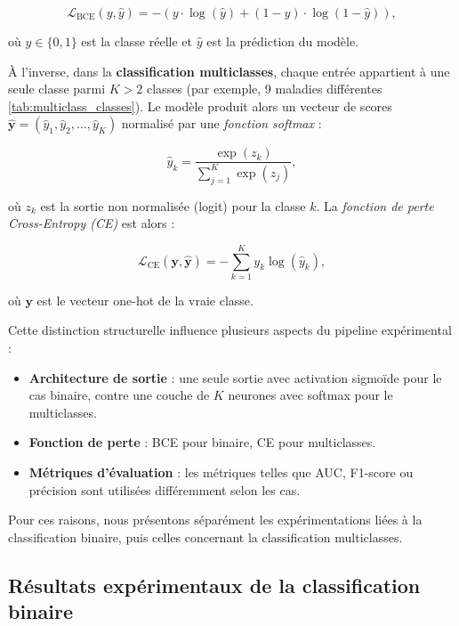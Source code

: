 \documentclass[12pt]{report}
\begin{document}
\begin{equation}
\mathcal{L}_{\text{BCE}}(y, \hat{y}) = - \left( y \cdot \log(\hat{y}) + (1 - y) \cdot \log(1 - \hat{y}) \right),
\end{equation}

où $ y \in \{0,1\} $ est la classe réelle et $ \hat{y} $ est la prédiction du modèle.

À l’inverse, dans la \textbf{classification multiclasses}, chaque entrée appartient à une seule classe parmi $K > 2$ classes (par exemple, 9 maladies différentes \autoref{tab:multiclass_classes}). Le modèle produit alors un vecteur de scores $\hat{\mathbf{y}} = (\hat{y}_1, \hat{y}_2, \ldots, \hat{y}_K)$ normalisé par une \textit{fonction softmax} :

\begin{equation}
\hat{y}_k = \frac{\exp(z_k)}{\sum_{j=1}^{K} \exp(z_j)},
\end{equation}

où $z_k$ est la sortie non normalisée (logit) pour la classe $k$. La \textit{fonction de perte Cross-Entropy (CE)} est alors :

\begin{equation}
\mathcal{L}_{\text{CE}}(\mathbf{y}, \hat{\mathbf{y}}) = - \sum_{k=1}^{K} y_k \log(\hat{y}_k),
\end{equation}

où $\mathbf{y}$ est le vecteur one-hot de la vraie classe.

Cette distinction structurelle influence plusieurs aspects du pipeline expérimental :
\begin{itemize}
    \item \textbf{Architecture de sortie} : une seule sortie avec activation sigmoïde pour le cas binaire, contre une couche de $K$ neurones avec softmax pour le multiclasses.
    \item \textbf{Fonction de perte} : BCE pour binaire, CE pour multiclasses.
    \item \textbf{Métriques d’évaluation} : les métriques telles que AUC, F1-score ou précision sont utilisées différemment selon les cas.
\end{itemize}

Pour ces raisons, nous présentons séparément les expérimentations liées à la classification binaire, puis celles concernant la classification multiclasses.


\subsection{Résultats expérimentaux de la classification binaire}
\end{document}
